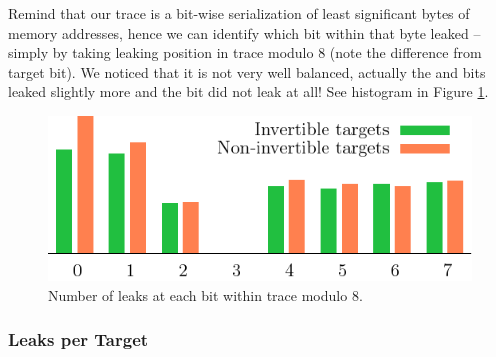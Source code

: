 	Remind that our trace is a bit-wise serialization of least significant bytes of memory addresses, hence we can identify which bit within that byte leaked -- simply by taking leaking position in trace modulo $8$ (note the difference from target bit). We noticed that it is not very well balanced, actually the  and  bits leaked slightly more and the  bit did not leak at all! See histogram in Figure \ref{fig:leakbithist}.
	
	\begin{figure}[h]
	\begin{center}
		\includegraphics{figures/leak_bit/plot.pdf}
		\caption{Number of leaks at each bit within trace modulo $8$.}
		\label{fig:leakbithist}
	\end{center}
	\end{figure}

\subsubsection{Leaks per Target}
	
